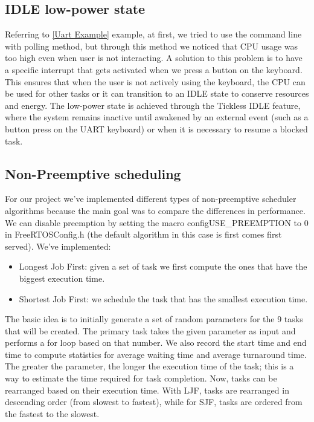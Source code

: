 \subsection{IDLE low-power state} 
Referring to \ref{Uart Example} example, at first, we tried to use the command line with polling method, but through this method we noticed that CPU usage was too high even when user is not interacting. 
A solution to this problem is to have a specific interrupt that gets activated when we press a button on the keyboard. This ensures that when the
user is not actively using the keyboard, the CPU can be used for other tasks or it can transition to an IDLE state to conserve resources and energy. The low-power state is achieved through the Tickless IDLE feature, where the system remains inactive until awakened by an external event (such as a button press on the UART keyboard) or when it is necessary to resume a blocked task.

\subsection{Non-Preemptive scheduling}
For our project we've implemented different types of non-preemptive scheduler algorithms because the main goal was to compare the differences in performance. We can disable preemption by setting the macro configUSE\_PREEMPTION to 0 in FreeRTOSConfig.h (the default algorithm in this case is first comes first served). We've implemented:
\begin{itemize}
    \item Longest Job First: given a set of task we first compute the ones that have the biggest execution time.
    \item Shortest Job First: we schedule the task that has the smallest execution time.
\end{itemize}
The basic idea is to initially generate a set of random parameters for the 9 tasks that will be created.
The primary task takes the given parameter as input and performs a for loop based on that number. We also record the start time and end time to compute statistics for average waiting time and average turnaround time.
The greater the parameter, the longer the execution time of the task; this is a way to estimate the time required for task completion.
Now, tasks can be rearranged based on their execution time.
With LJF, tasks are rearranged in descending order (from slowest to fastest), while for SJF, tasks are ordered from the fastest to the slowest.




